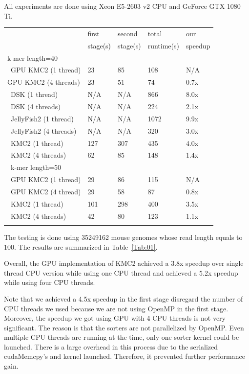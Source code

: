 \documentclass{bioinfo}
\begin{document}
All experiments are done using Xeon E5-2603 v2 CPU and GeForce GTX 1080 Ti.
\begin{table}[H]
 {\begin{tabular}{@{}lllll@{}}\toprule
& first & second & total & our\\\
& stage(s) & stage(s) & runtime(s) & speedup\\\midrule
k-mer length=40\\\
GPU KMC2 (1 thread) & 23 & 85 & 108 & N/A\\
GPU KMC2 (4 threads) & 23 & 51 & 74 & 0.7x\\\
DSK (1 thread) & N/A & N/A & 866 & 8.0x\\\
DSK (4 threads) & N/A & N/A & 224 & 2.1x\\\
JellyFish2 (1 thread) & N/A & N/A & 1072 & 9.9x\\\
JellyFish2 (4 threads) & N/A & N/A & 320 & 3.0x\\\
KMC2 (1 thread) & 127 & 307 & 435 & 4.0x\\\
KMC2 (4 threads) & 62 & 85 & 148 & 1.4x\\\
k-mer length=50\\\
GPU KMC2 (1 thread) & 29 & 86 & 115 & N/A\\\
GPU KMC2 (4 thread) & 29 & 58 & 87 & 0.8x\\\
KMC2 (1 thread) & 101 & 298 & 400 & 3.5x\\\
KMC2 (4 threads) & 42 & 80 & 123 & 1.1x\\\botrule
\end{tabular}}{}
\end{table}

The testing is done using 35249162 mouse genomes whose read length equals to 100.
The results are summarized in Table~\ref{Tab:01}.

Overall, the GPU implementation of KMC2 achieved a 3.8x speedup over single thread CPU
version while using one CPU thread and achieved a 5.2x speedup while using four CPU
threads.

Note that we achieved a 4.5x speedup in the first stage disregard the number of CPU
threads we used because we are not using OpenMP in the first stage.
Moreover, the speedup we got using GPU with 4 CPU threads is not very significant.
The reason is that the sorters are not parallelized by OpenMP. Even multiple CPU threads
are running at the time, only one sorter kernel could be launched.
There is a large overhead in this process due to the serialized cudaMemcpy's and kernel
launched. Therefore, it prevented further performance gain.
\end{document}
